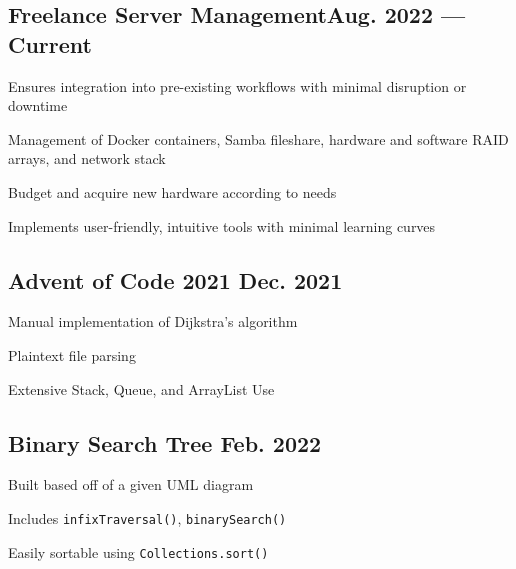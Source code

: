 \documentclass[letter,10pt]{article}
\begin{document}
\subsection{{Freelance Server Management\hfill Aug. 2022 --- Current}}
\begin{zitemize}
	\item Ensures integration into pre-existing workflows with minimal disruption or downtime
    \item Management of Docker containers, Samba fileshare, hardware and software RAID arrays, and network stack
	\item Budget and acquire new hardware according to needs
    \item Implements user-friendly, intuitive tools with minimal learning curves
\end{zitemize}

\subsection{{Advent of Code 2021 \hfill Dec. 2021}}
\begin{zitemize}
	\item Manual implementation of Dijkstra's algorithm
	\item Plaintext file parsing
	\item Extensive Stack, Queue, and ArrayList Use
\end{zitemize}

\subsection{{Binary Search Tree \hfill Feb. 2022}}
\begin{zitemize}
	\item Built based off of a given UML diagram
	\item Includes \verb|infixTraversal()|, \verb|binarySearch()|
	\item Easily sortable using \verb|Collections.sort()|
\end{zitemize}

\end{document}
